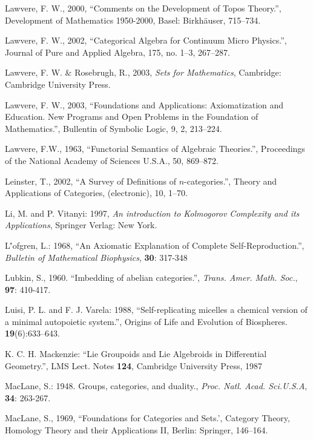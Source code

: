 \documentclass[12pt]{article}
\begin{document}
\begin{thebibliography}{399}
Lawvere, F. W., 2000, ``Comments on the Development of Topos Theory.'', Development of Mathematics 1950-2000, Basel: Birkh\"auser, 715--734. 

Lawvere, F. W., 2002, ``Categorical Algebra for Continuum Micro Physics.'', Journal of Pure and Applied Algebra, 175, no. 1--3, 267--287. 

Lawvere, F. W. \& Rosebrugh, R., 2003, \emph{Sets for Mathematics}, Cambridge: Cambridge University Press.  

Lawvere, F. W., 2003, ``Foundations and Applications: Axiomatization and Education. New Programs and Open Problems in the Foundation of Mathematics.'', Bullentin of Symbolic Logic, 9, 2, 213--224. 

Lawvere, F.W., 1963, ``Functorial Semantics of Algebraic Theories.'', Proceedings of the National Academy of Sciences U.S.A., 50, 869--872. 

Leinster, T., 2002, ``A Survey of Definitions of $n$-categories.'', Theory and Applications of Categories, (electronic), 10, 1--70. 

Li, M. and P. Vitanyi: 1997, \emph{An introduction to Kolmogorov Complexity and its Applications}, Springer Verlag: New York.

L\''{o}fgren,  L.: 1968, ``An Axiomatic Explanation of Complete Self-Reproduction.'', \emph{Bulletin of Mathematical Biophysics}, \textbf{30}: 317-348

Lubkin, S., 1960. ``Imbedding of abelian categories.'',  {\em Trans. Amer. Math. Soc.}, \textbf{97}: 410-417.

Luisi, P. L. and F. J. Varela: 1988, ``Self-replicating micelles a chemical version of a minimal autopoietic system.'', Origins of Life and Evolution of Biospheres. \textbf{19}(6):633--643.

K. C. H. Mackenzie: ``Lie Groupoids and Lie Algebroids in Differential Geometry.'', LMS Lect. Notes \textbf{124}, Cambridge University Press, 1987

MacLane, S.: 1948. Groups, categories, and duality., {\em Proc. Natl. Acad. Sci.U.S.A},
\textbf{34}: 263-267.

MacLane, S., 1969, ``Foundations for Categories and Sets.', Category Theory, Homology Theory and their Applications II, Berlin: Springer, 146--164. 


\end{thebibliography}
\end{document}
